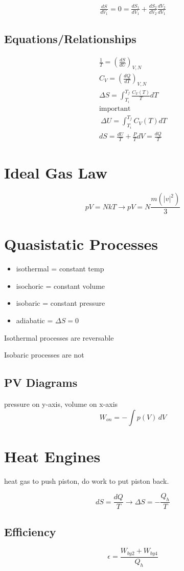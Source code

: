 \documentclass[fleqn]{report}
\newcommand{\equations}[1]{
\begin{gather*}
#1
\end{gather*}
}
\begin{document}
\equations{
\frac{dS}{dV_1} = 0 = \frac{dS_1}{dV_1} + \frac{dS_2}{dV_2} \frac{dV_2}{dV_1}
}


\subsection{Equations/Relationships}
\equations{
\frac{1}{T} = (\frac{dS}{dU})_{V, N}
\\
C_V = (\frac{dQ}{dT})_{V, N}
\\
\Delta S = \int^{T_{f}}_{T_i} \frac{C_V(T)}{T} dT
\\
\textrm{important}
\\\
\Delta U = \int^{T_{f}}_{T_i}  C_V (T) dT
\\
dS = \frac{dU}{T} + \frac{P}{T} dV = \frac{dQ}{T}
}
\section{Ideal Gas Law}
\[
pV = NkT
\rightarrow
pV = N \frac{m(|v|^2)}{3}
\]
\section{Quasistatic Processes}
\begin{itemize}
\item
isothermal = constant temp
\item
isochoric = constant volume
\item
isobaric = constant pressure
\item
adiabatic = $\Delta S = 0$
\end{itemize}

Isothermal processes are reversable

Isobaric processes are not

\subsection{PV Diagrams}
pressure on y-axis, volume on x-axis
\[
W_{on} = - \int p(V) \, dV
\]

\section{Heat Engines}
heat gas to push piston, do work to put piston back.

\[
dS = \frac{dQ}{T} \rightarrow \Delta S = - \frac{Q_h}{T}
\]

\subsection{Efficiency}
\[
\epsilon = \frac{W_{by2} + W_{by4}}{Q_h}
\]
\end{document}
